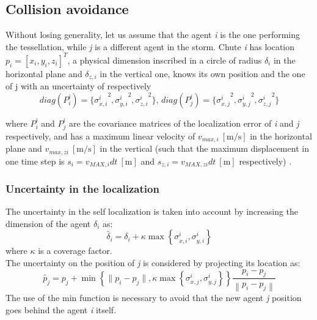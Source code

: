 \subsection{Collision avoidance}
Without losing generality, let us assume that the agent \textit{i} is the one performing the tessellation, while \textit{j} is a different agent in the storm. Chute \textit{i} has location $p_i=\left[x_i, y_i, z_i\right]^T$, a physical dimension inscribed in a circle of radius $\delta_i$ in the horizontal plane and $\delta_{z,i}$ in the vertical one, knows its own position and the one of j with an uncertainty of respectively
{\small
\begin{equation*}
  diag(P_i^i)=\{{ \sigma_{x,i}^{i}}^{2}, {\sigma_{y,i}^i}^{2}, {\sigma_{z,i}^i}^{2}\}, \,  diag(P_j^i)=\{{\sigma_{x,j}^i}^{2}, {\sigma_{y,j}^i}^{2}, {\sigma_{z,j}^i}^{2}\}
\end{equation*}
}

where $P_i^i$ and $P_j^i$ are the covariance matrices of the localization error of \textit{i} and \textit{j} respectively, 
and has a maximum linear velocity of $v_{max,i} \ \left[\si{\meter\per\second}\right]$ in the horizontal plane and $v_{max,zi} \ \left[\si{\meter\per\second}\right]$ in the vertical (such that the maximum displacement in one time step is $s_i=v_{MAX,i}dt \ \left[\si{\meter}\right]$ and $s_{z,i}=v_{MAX,zi}dt \ \left[\si{\meter}\right]$ respectively) . 

\subsubsection{Uncertainty in the localization} 
  The uncertainty in the self localization is taken into account by increasing the dimension of the agent $\delta_i$ as:
    \begin{equation}
        \tilde{\delta_i}=\delta_i + \kappa \max \left\{\sigma_{x,i}^i, \sigma_{y,i}^i \right\}
        \label{eq:expand_dimension}
    \end{equation}
    where $\kappa$ is a coverage factor.\\
    The uncertainty on the position of \textit{j} is considered by projecting its location as:
    \begin{equation}
        \tilde{p_j} = p_j + \min\left\{ \lVert p_i-p_j \lVert, \kappa \max\left\{\sigma_{x,j}^i, \sigma_{y,j}^i\right\}\right\}\frac{p_i - p_j}{\left\lVert p_i - p_j \right\lVert}
    \end{equation}
   The use of the min function is necessary to avoid that the new agent \textit{j} position goes behind the agent \textit{i} itself.   
    
